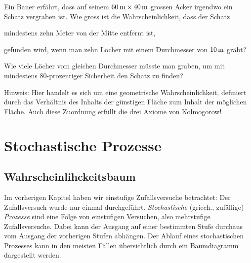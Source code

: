 \documentclass[%
11pt,%
twoside,%
titlepage,%
german,%
headsepline%
]{scrartcl}
\begin{document}
\begin{ueb}
Ein Bauer erfährt, dass auf seinem $\unit[60]{m} \times \unit[40]{m}$ grossen Acker irgendwo ein Schatz vergraben ist. Wie gross ist die Wahrscheinlichkeit, dass der Schatz

\begin{enumeratea}
\item mindestens zehn Meter von der Mitte entfernt ist,
\item gefunden wird, wenn man zehn Löcher mit einem
Durchmesser von $\unit[10]{m}$ gräbt?
\item Wie viele Löcher vom gleichen Durchmesser müsste man graben, um mit mindestens $80$-prozentiger Sicherheit den Schatz zu finden?
\end{enumeratea}

Hinweis: Hier handelt es sich um eine geometrische Wahrscheinlichkeit, definiert durch das Verhältnis des Inhalts der günstigen Fläche zum Inhalt der möglichen Fläche. Auch diese Zuordnung erfüllt die drei Axiome von Kolmogorow!
\end{ueb}


\clearpage

\section{Stochastische Prozesse}

\subsection{Wahrscheinlihckeitsbaum}

Im vorherigen Kapitel haben wir einstufige Zufallsversuche betrachtet: Der Zufallsversuch wurde nur einmal durchgeführt. \emph{Stochastische} (griech., zufällige) \emph{Prozesse} sind eine Folge von einstufigen Versuchen, also mehrstufige Zufallsversuche. Dabei kann der Ausgang auf einer bestimmten Stufe durchaus vom Ausgang der vorherigen Stufen abhängen. Der Ablauf eines stochastischen Prozesses kann in den meisten Fällen übersichtlich durch ein Baumdiagramm dargestellt werden.
\end{document}
